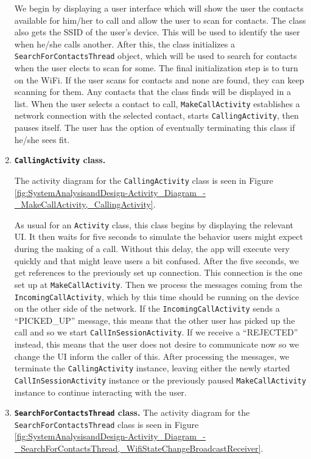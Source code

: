 \documentclass[12pt,svgnames,smaller]{article} %
\begin{document}
\begin{enumerate}
		We begin by displaying a user interface which will show the user the contacts available for him/her to call and allow the user to scan for contacts. The class also gets the SSID of the user's device. This will be used to identify the user when he/she calls another. After this, the class initializes a \texttt{SearchForContactsThread} object, which will be used to search for contacts when the user elects to scan for some. The final initialization step is to turn on the WiFi. If the user scans for contacts and none are found, they can keep scanning for them. Any contacts that the class finds will be displayed in a list. When the user selects a contact to call, \texttt{MakeCallActivity} establishes a network connection with the selected contact, starts \texttt{CallingActivity}, then pauses itself. The user has the option of eventually terminating this class if he/she sees fit.
		
		\item \textbf{\texttt{CallingActivity} class.} 
		
		The activity diagram for the \texttt{CallingActivity} class is seen in Figure \ref{fig:SystemAnalysisandDesign-Activity_Diagram_-_MakeCallActivity,_CallingActivity}.
		
		As usual for an \texttt{Activity} class, this class begins by displaying the relevant UI. It then waits for five seconds to simulate the behavior users might expect during the making of a call. Without this delay, the app will execute very quickly and that might leave users a bit confused. After the five seconds, we get references to the previously set up connection. This connection is the one set up at \texttt{MakeCallActivity}. Then we process the messages coming from the \texttt{IncomingCallActivity}, which by this time should be running on the device on the other side of the network. If the \texttt{IncomingCallActivity} sends a “PICKED\_UP” message, this means that the other user has picked up the call and so we start \texttt{CallInSessionActivity}. If we receive a “REJECTED” instead, this means that the user does not desire to communicate now so we change the UI inform the caller of this. After processing the messages, we terminate the \texttt{CallingActivity} instance, leaving either the newly started \texttt{CallInSessionActivity} instance or the previously paused \texttt{MakeCallActivity} instance to continue interacting with the user.
		
		\item \textbf{\texttt{SearchForContactsThread} class.} 
		The activity diagram for the \texttt{SearchForContactsThread} class is seen in Figure \ref{fig:SystemAnalysisandDesign-Activity_Diagram_-_SearchForContactsThread,_WifiStateChangeBroadcastReceiver}.
			

\end{enumerate}
\end{document}
